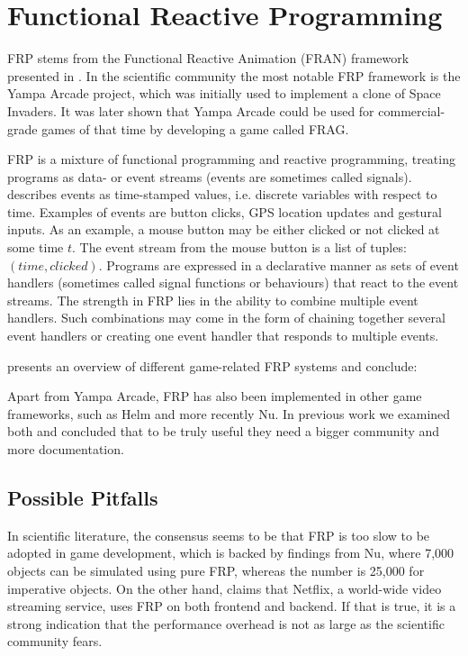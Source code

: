 \section{Functional Reactive Programming}
\gls{FRP} stems from the Functional Reactive Animation (FRAN) framework presented in \cite{ElliottHudak97:Fran}. In the scientific community the most notable \gls{FRP} framework is the Yampa Arcade project\cite{courtney2003yampa}, which was initially used to implement a clone of Space Invaders. It was later shown that Yampa Arcade could be used for commercial-grade games of that time by developing a game called FRAG\cite{cheong2005functional}.

\gls{FRP} is a mixture of functional programming and reactive programming, treating programs as data- or event streams (events are sometimes called signals). \cite{lettier:frp} describes events as time-stamped values, i.e. discrete variables with respect to time. Examples of events are button clicks, GPS location updates and gestural inputs\cite{singh:frp}. As an example, a mouse button may be either clicked or not clicked at some time $t$. The event stream from the mouse button is a list of tuples: $(time,clicked)$. Programs are expressed in a declarative manner as sets of event handlers (sometimes called signal functions or behaviours) that react to the event streams. The strength in \gls{FRP} lies in the ability to combine multiple event handlers. Such combinations may come in the form of chaining together several event handlers or creating one event handler that responds to multiple events\cite{lettier:frp}.

\cite{maraffi:frp} presents an overview of different game-related \gls{FRP} systems and conclude:

Apart from Yampa Arcade, \gls{FRP} has also been implemented in other game frameworks, such as Helm \cite{helm:wiki} and more recently Nu\cite{nu:github}. In previous work we examined both and concluded that to be truly useful they need a bigger community and more documentation\cite{p92018gameplay}.

\subsection{Possible Pitfalls}
In scientific literature, the consensus seems to be that \gls{FRP} is too slow to be adopted in game development\cite{maraffi:frp,cheong2005functional}, which is backed by findings from Nu, where 7,000 objects can be simulated using pure \gls{FRP}, whereas the number is 25,000 for imperative objects\cite{edds2016whyFunctional}. On the other hand, \cite{rey:frp} claims that Netflix, a world-wide video streaming service, uses \gls{FRP} on both frontend and backend. If that is true, it is a strong indication that the performance overhead is not as large as the scientific community fears.


